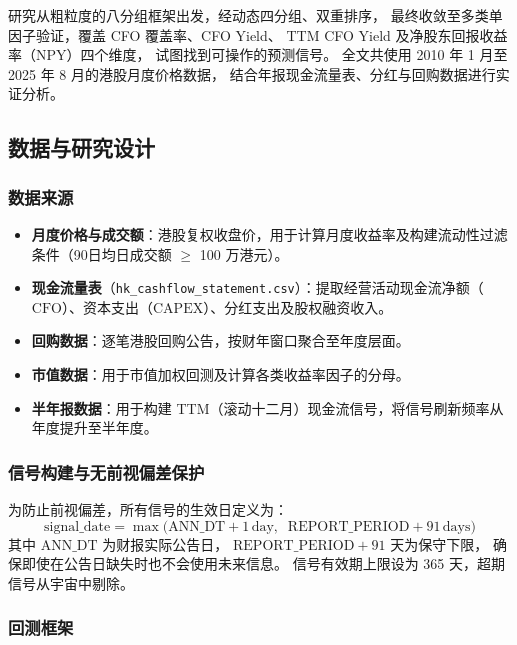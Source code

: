 \documentclass[a4paper,10pt]{article}
\begin{document}
研究从粗粒度的八分组框架出发，经动态四分组、双重排序，
最终收敛至多类单因子验证，覆盖 CFO 覆盖率、CFO Yield、
TTM CFO Yield 及净股东回报收益率（NPY）四个维度，
试图找到可操作的预测信号。
全文共使用 2010 年 1 月至 2025 年 8 月的港股月度价格数据，
结合年报现金流量表、分红与回购数据进行实证分析。



\subsection{数据与研究设计}

\subsubsection{数据来源}

\begin{itemize}[leftmargin=2em]
    \item \textbf{月度价格与成交额}：港股复权收盘价，用于计算月度收益率及构建流动性过滤条件（90日均日成交额 $\geq$ 100 万港元）。
    \item \textbf{现金流量表}（\texttt{hk\_cashflow\_statement.csv}）：提取经营活动现金流净额（$\mathrm{CFO}$）、资本支出（$\mathrm{CAPEX}$）、分红支出及股权融资收入。
    \item \textbf{回购数据}：逐笔港股回购公告，按财年窗口聚合至年度层面。
    \item \textbf{市值数据}：用于市值加权回测及计算各类收益率因子的分母。
    \item \textbf{半年报数据}：用于构建 TTM（滚动十二月）现金流信号，将信号刷新频率从年度提升至半年度。
\end{itemize}

\subsubsection{信号构建与无前视偏差保护}

为防止前视偏差，所有信号的生效日定义为：
\[
    \mathrm{signal\_date} = \max\!\bigl(\mathrm{ANN\_DT} + 1\,\mathrm{day},\;\;
    \mathrm{REPORT\_PERIOD} + 91\,\mathrm{days}\bigr)
\]
其中 $\mathrm{ANN\_DT}$ 为财报实际公告日，
$\mathrm{REPORT\_PERIOD} + 91$ 天为保守下限，
确保即使在公告日缺失时也不会使用未来信息。
信号有效期上限设为 365 天，超期信号从宇宙中剔除。

\subsubsection{回测框架}
\end{document}
